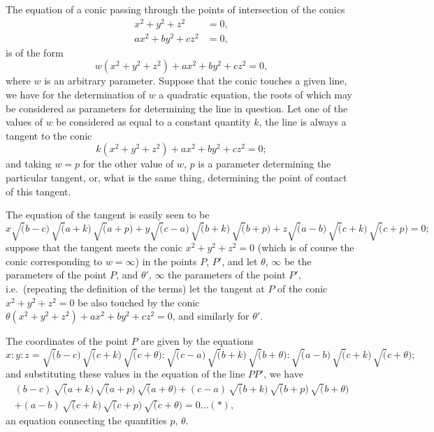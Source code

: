 \documentclass[11pt]{article}
\begin{document}
The equation of a conic passing through the points of intersection of the conics
\begin{align*}
x^2 + y^2 + z^2 &= 0,\\
ax^2 + by^2 + cz^2 &= 0,
\end{align*}
is of the form
\[
w(x^2+y^2+z^2) + ax^2 + by^2 + cz^2 = 0,
\]
where $w$ is an arbitrary parameter. Suppose that the conic touches a given line, we have for the determination of $w$ a quadratic equation, the roots of which may be considered as parameters for determining the line in question. Let one of the values of $w$ be considered as equal to a constant quantity $k$, the line is always a tangent to the conic
\[
k(x^2+y^2+z^2) + ax^2 + by^2 + cz^2 = 0;
\]
and taking $w=p$ for the other value of $w$, $p$ is a parameter determining the particular tangent, or, what is the same thing, determining the point of contact of this tangent.

The equation of the tangent is easily seen to be
\[
x\surd(b-c)\,\surd(a+k)\,\surd(a+p) + y\surd(c-a)\,\surd(b+k)\,\surd(b+p) + z\surd(a-b)\,\surd(c+k)\,\surd(c+p) = 0;
\]
suppose that the tangent meets the conic $x^2+y^2+z^2=0$ (which is of course the conic corresponding to $w=\infty$) in the points $P$, $P'$, and let $\theta$, $\infty$ be the parameters of the point $P$, and $\theta'$, $\infty$ the parameters of the point $P'$, i.e.\ (repeating the definition of the terms) let the tangent at $P$ of the conic $x^2+y^2+z^2=0$ be also touched by the conic $\theta(x^2+y^2+z^2)+ax^2+by^2+cz^2=0$, and similarly for $\theta'$.

The coordinates of the point $P$ are given by the equations
\[
x : y : z = \surd(b-c)\,\surd(c+k)\,\surd(c+\theta) : \surd(c-a)\,\surd(b+k)\,\surd(b+\theta) : \surd(a-b)\,\surd(c+k)\,\surd(c+\theta);
\]
and substituting these values in the equation of the line $PP'$, we have
\begin{multline*}
(b-c)\,\surd(a+k)\,\surd(a+p)\,\surd(a+\theta) + (c-a)\,\surd(b+k)\,\surd(b+p)\,\surd(b+\theta)\\
+ (a-b)\,\surd(c+k)\,\surd(c+p)\,\surd(c+\theta) = 0\ldots(*),
\end{multline*}
an equation connecting the quantities $p$, $\theta$.
\end{document}
